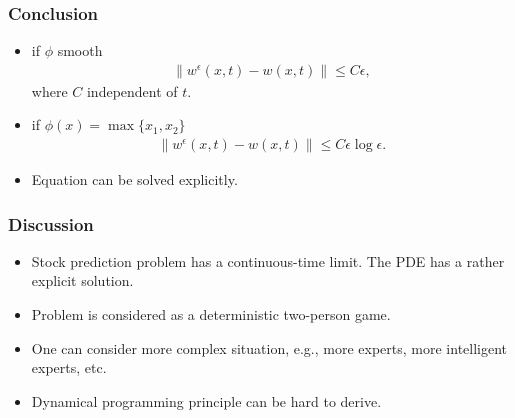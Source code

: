 \documentclass{beamer}
\begin{document}
\begin{frame}
\frametitle{Conclusion}
\begin{itemize}
\item if $\phi$ smooth
\begin{align*}
\|w^\epsilon(x,t)-w(x,t)\|\le C\epsilon,
\end{align*}
where $C$ independent of $t$.
\item if $\phi(x) = \max\{x_1,x_2\}$
\begin{align*}
\|w^\epsilon(x,t)-w(x,t)\|\le C\epsilon\log\epsilon.
\end{align*} 
\item Equation can be solved explicitly.
\end{itemize}
\end{frame}



\begin{frame}
\frametitle{Discussion}
\begin{itemize}
\item Stock prediction problem has a continuous-time limit. The PDE has a rather explicit solution. 
\pause
\item Problem is considered as a deterministic two-person game.
\pause
\item One can consider more complex situation, e.g., more experts, more intelligent experts, etc.
\pause
\item Dynamical programming principle can be hard to derive.
\end{itemize}
\end{frame}
\end{document}
